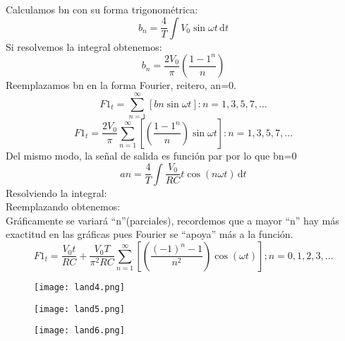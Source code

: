 \documentclass[a4paper,12pt]{report}
\begin{document}
\begin{enumerate}
Calculamos bn con su forma trigonométrica:
$$
b_{n} = \frac{4}{T}\int V_{0}\sin \omega t \,\mathrm{d}t
$$
Si resolvemos la integral obtenemos:
$$
b_{n} = \frac{2V_{0}}{\pi} \left( \frac{1-1^{n}}{n} \right)
$$
Reemplazamos bn en la forma Fourier, reitero, an=0.
$$
F1_{t} = \sum_{n=1}^{\infty} \left[ bn \sin \omega t \right]: n = 1,3,5,7,\ldots
$$
$$
F1_{t} = \frac{2V_{0}}{\pi}\sum_{n=1}^{\infty} \left[ \left( \frac{1-1^{n}}{n} \right) \sin \omega t \right]: n = 1,3,5,7,\ldots
$$
Del mismo modo, la señal de salida es función par por lo que bn=0
$$
an = \frac{4}{T} \int \frac{V_{0}}{RC} t \cos(n\omega t)\,\mathrm{d}t
$$
Resolviendo la integral:\\
Reemplazando obtenemos:\\
Gráficamente se variará ``n''(parciales), recordemos que a mayor ``n'' hay más exactitud en las gráficas pues Fourier se ``apoya'' más a la función.
$$
F1_{t} = \frac{V_{0}t}{RC} + \frac{V_{0}T}{\pi^{2} RC} \sum_{n=1}^{\infty} \left[ \left( \frac{(-1)^{n} - 1}{n^{2}} \right) \cos (\omega t) \right]; n=0,1,2,3,\ldots
$$
\begin{figure}[H]
\centering
\texttt{[image: land4.png]}
\end{figure}
\begin{figure}[H]
\centering
\texttt{[image: land5.png]}
\end{figure}
\begin{figure}[H]
\centering
\texttt{[image: land6.png]}
\end{figure}
\end{enumerate}
\end{document}
